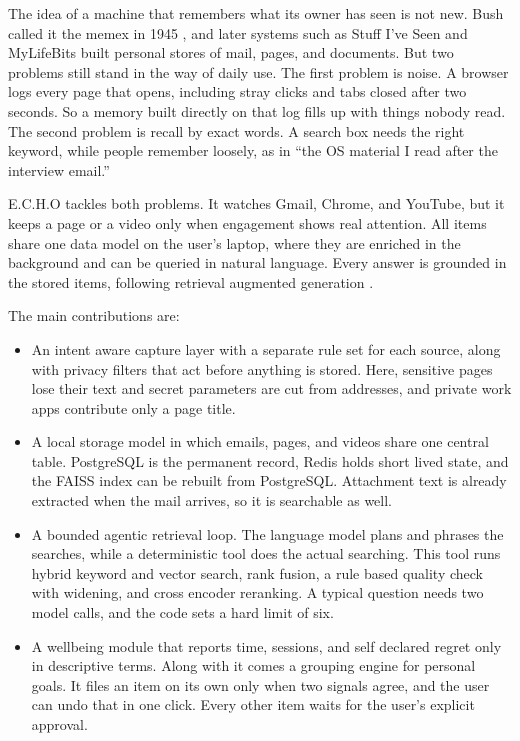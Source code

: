 \documentclass[conference]{IEEEtran}
\begin{document}
The idea of a machine that remembers what its owner has seen is not new. Bush called it the memex in 1945 \cite{b1}, and later systems such as Stuff I've Seen \cite{b2} and MyLifeBits \cite{b3} built personal stores of mail, pages, and documents. But two problems still stand in the way of daily use. The first problem is noise. A browser logs every page that opens, including stray clicks and tabs closed after two seconds. So a memory built directly on that log fills up with things nobody read. The second problem is recall by exact words. A search box needs the right keyword, while people remember loosely, as in ``the OS material I read after the interview email.''

E.C.H.O tackles both problems. It watches Gmail, Chrome, and YouTube, but it keeps a page or a video only when engagement shows real attention. All items share one data model on the user's laptop, where they are enriched in the background and can be queried in natural language. Every answer is grounded in the stored items, following retrieval augmented generation \cite{b4}.

The main contributions are:
\begin{itemize}
\item An intent aware capture layer with a separate rule set for each source, along with privacy filters that act before anything is stored. Here, sensitive pages lose their text and secret parameters are cut from addresses, and private work apps contribute only a page title.
\item A local storage model in which emails, pages, and videos share one central table. PostgreSQL is the permanent record, Redis holds short lived state, and the FAISS index can be rebuilt from PostgreSQL. Attachment text is already extracted when the mail arrives, so it is searchable as well.
\item A bounded agentic retrieval loop. The language model plans and phrases the searches, while a deterministic tool does the actual searching. This tool runs hybrid keyword and vector search, rank fusion, a rule based quality check with widening, and cross encoder reranking. A typical question needs two model calls, and the code sets a hard limit of six.
\item A wellbeing module that reports time, sessions, and self declared regret only in descriptive terms. Along with it comes a grouping engine for personal goals. It files an item on its own only when two signals agree, and the user can undo that in one click. Every other item waits for the user's explicit approval.
\end{itemize}
\end{document}
